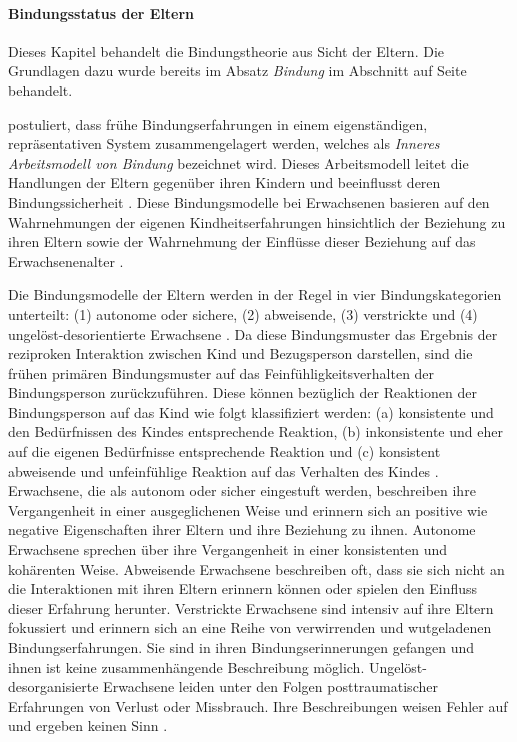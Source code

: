 \paragraph{Bindungsstatus der Eltern}\label{sec:Bindungsstatus}
Dieses Kapitel behandelt die Bindungstheorie aus Sicht der Eltern. Die Grundlagen dazu wurde bereits im Absatz \textit{Bindung} im Abschnitt \textit{} auf Seite \pageref{sec:Entwicklungsaufgaben} behandelt.

 postuliert, dass frühe Bindungserfahrungen in einem eigenständigen, repräsentativen System zusammengelagert werden, welches als \textit{Inneres Arbeitsmodell von Bindung} bezeichnet wird. Dieses Arbeitsmodell leitet die Handlungen der Eltern gegenüber ihren Kindern und beeinflusst deren Bindungssicherheit \cite{Siegler2008}. Diese Bindungsmodelle bei Erwachsenen basieren auf den Wahrnehmungen der eigenen Kindheitserfahrungen hinsichtlich der Beziehung zu ihren Eltern sowie der Wahrnehmung der Einflüsse dieser Beziehung auf das Erwachsenenalter \cite{Main1985}.

Die Bindungsmodelle der Eltern werden in der Regel in vier Bindungskategorien unterteilt: (1) autonome oder sichere, (2) abweisende, (3) verstrickte und (4) ungelöst-desorientierte Erwachsene \cite[S.~593 ff.]{Siegler2008}. Da diese Bindungsmuster das Ergebnis der reziproken Interaktion zwischen Kind und Bezugsperson darstellen, sind die frühen primären Bindungsmuster auf das Feinfühligkeitsverhalten der Bindungsperson zurückzuführen. Diese können bezüglich der Reaktionen der Bindungsperson auf das Kind wie folgt klassifiziert werden: (a) konsistente und den Bedürfnissen des Kindes entsprechende Reaktion, (b) inkonsistente und eher auf die eigenen Bedürfnisse entsprechende Reaktion und (c) konsistent abweisende und unfeinfühlige Reaktion auf das Verhalten des Kindes \cite{Schmidt2004}. 
Erwachsene, die als autonom oder sicher eingestuft werden, beschreiben ihre Vergangenheit in einer ausgeglichenen Weise und erinnern sich an positive wie negative Eigenschaften ihrer Eltern und ihre Beziehung zu ihnen. Autonome Erwachsene sprechen über ihre Vergangenheit in einer konsistenten und kohärenten Weise. Abweisende Erwachsene beschreiben oft, dass sie sich nicht an die Interaktionen mit ihren Eltern erinnern können oder spielen den Einfluss dieser Erfahrung herunter. Verstrickte Erwachsene sind intensiv auf ihre Eltern fokussiert und erinnern sich an eine Reihe von verwirrenden und wutgeladenen Bindungserfahrungen. Sie sind in ihren Bindungserinnerungen gefangen und ihnen ist keine zusammenhängende Beschreibung möglich. Ungelöst-desorganisierte Erwachsene leiden unter den Folgen posttraumatischer Erfahrungen von Verlust oder Missbrauch. Ihre Beschreibungen weisen Fehler auf und ergeben keinen Sinn \cite{Schmidt2004}.

